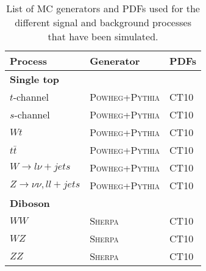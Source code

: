 \begin{table} [htb]
\begin{center}
\renewcommand{\arraystretch}{1.2}
\begin{tabular}{|l l l|}
\hline
Process & Generator & PDFs \\
\hline
\textbf{Single top} & & \\
$t$-channel & \textsc{Powheg}+\textsc{Pythia} & CT10 \\
$s$-channel & \textsc{Powheg}+\textsc{Pythia} & CT10 \\
$Wt$ & \textsc{Powheg}+\textsc{Pythia} & CT10 \\
\hline
\textbf{$t\bar{t}$} & \textsc{Powheg}+\textsc{Pythia} & CT10 \\
\textbf{$W\rightarrow l \nu +jets$} & \textsc{Powheg}+\textsc{Pythia} & CT10 \\
\textbf{$Z \rightarrow \nu \nu, ll +jets$} & \textsc{Powheg}+\textsc{Pythia} & CT10 \\
\hline
\textbf{Diboson} & & \\
$WW$ & \textsc{Sherpa} & CT10 \\
$WZ$ & \textsc{Sherpa} & CT10 \\
$ZZ$ & \textsc{Sherpa} & CT10 \\
\hline
\end{tabular}
\caption{List of MC generators and PDFs used for the different signal and background processes that have been simulated.}
\label{Table:Generator}
\end{center}
\end{table}

